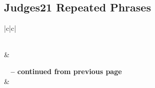 \subsection{Judges21 Repeated Phrases}


\normalsize
 
\begin{center}
\begin{longtable}{|c|c|}
\caption[Judges21 Repeated Phrases]{Judges21 Repeated Phrases}\label{table:Repeated Phrases Judges21} \\
\hline {} &  \\ \hline 
\endfirsthead
 
{{\bfseries \tablename\ \thetable{} -- continued from previous page}} \\  
\hline {} &  \\ \hline 
\endhead
 

\end{longtable}
\end{center}
